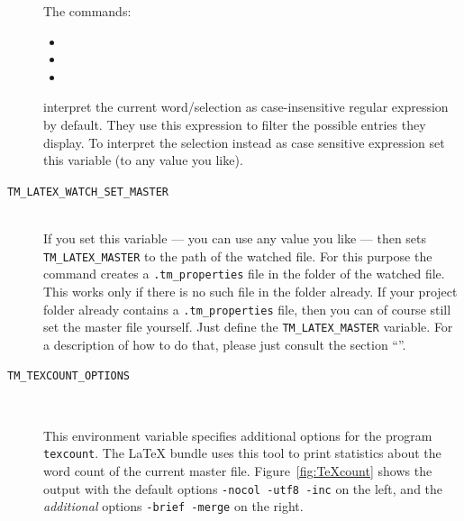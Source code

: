 \documentclass[11pt, x11names]{article}
\begin{document}
\begin{description}
  The commands:

  \begin{itemize}
    \item {}
    \item {}
    \item {}
  \end{itemize}

  interpret the current word/selection as case-insensitive regular expression by default. They use this expression to filter the possible entries they display. To interpret the selection instead as case sensitive expression set this variable (to any value you like).

  \item[\texttt{TM\_LATEX\_WATCH\_SET\_MASTER}]~\\

  If you set this variable — you can use any value you like — then  sets \texttt{TM\_LATEX\_MASTER} to the path of the watched file. For this purpose the command creates a \texttt{.tm\_properties} file in the folder of the watched file. This works only if there is no such file in the folder already. If your project folder already contains a \texttt{.tm\_properties} file, then you can of course still set the master file yourself. Just define the \texttt{TM\_LATEX\_MASTER} variable. For a description of how to do that, please just consult the section “”.

  \item[\texttt{TM\_TEXCOUNT\_OPTIONS}]~\\

  \begin{sloppypar}
  This environment variable specifies additional options for the program \texttt{texcount}. The LaTeX bundle uses this tool to print statistics about the word count of the current master file. Figure~\ref{fig:TeXcount} shows the output with the default options \texttt{-nocol -utf8 -inc} on the left, and the \emph{additional} options \texttt{-brief -merge} on the right.
  \end{sloppypar}


\end{description}
\end{document}
